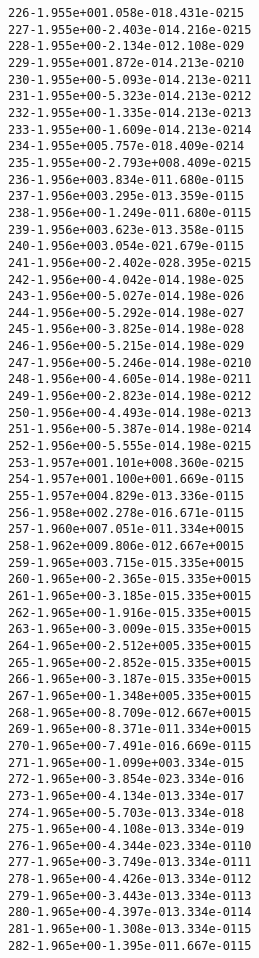 \begin{alltt}
 226  -1.955e+00   1.058e-01   8.431e-02   15
 227  -1.955e+00  -2.403e-01   4.216e-02   15
 228  -1.955e+00  -2.134e-01   2.108e-02    9
 229  -1.955e+00   1.872e-01   4.213e-02   10
 230  -1.955e+00  -5.093e-01   4.213e-02   11
 231  -1.955e+00  -5.323e-01   4.213e-02   12
 232  -1.955e+00  -1.335e-01   4.213e-02   13
 233  -1.955e+00  -1.609e-01   4.213e-02   14
 234  -1.955e+00   5.757e-01   8.409e-02   14
 235  -1.955e+00  -2.793e+00   8.409e-02   15
 236  -1.956e+00   3.834e-01   1.680e-01   15
 237  -1.956e+00   3.295e-01   3.359e-01   15
 238  -1.956e+00  -1.249e-01   1.680e-01   15
 239  -1.956e+00   3.623e-01   3.358e-01   15
 240  -1.956e+00   3.054e-02   1.679e-01   15
 241  -1.956e+00  -2.402e-02   8.395e-02   15
 242  -1.956e+00  -4.042e-01   4.198e-02    5
 243  -1.956e+00  -5.027e-01   4.198e-02    6
 244  -1.956e+00  -5.292e-01   4.198e-02    7
 245  -1.956e+00  -3.825e-01   4.198e-02    8
 246  -1.956e+00  -5.215e-01   4.198e-02    9
 247  -1.956e+00  -5.246e-01   4.198e-02   10
 248  -1.956e+00  -4.605e-01   4.198e-02   11
 249  -1.956e+00  -2.823e-01   4.198e-02   12
 250  -1.956e+00  -4.493e-01   4.198e-02   13
 251  -1.956e+00  -5.387e-01   4.198e-02   14
 252  -1.956e+00  -5.555e-01   4.198e-02   15
 253  -1.957e+00   1.101e+00   8.360e-02   15
 254  -1.957e+00   1.100e+00   1.669e-01   15
 255  -1.957e+00   4.829e-01   3.336e-01   15
 256  -1.958e+00   2.278e-01   6.671e-01   15
 257  -1.960e+00   7.051e-01   1.334e+00   15
 258  -1.962e+00   9.806e-01   2.667e+00   15
 259  -1.965e+00   3.715e-01   5.335e+00   15
 260  -1.965e+00  -2.365e-01   5.335e+00   15
 261  -1.965e+00  -3.185e-01   5.335e+00   15
 262  -1.965e+00  -1.916e-01   5.335e+00   15
 263  -1.965e+00  -3.009e-01   5.335e+00   15
 264  -1.965e+00  -2.512e+00   5.335e+00   15
 265  -1.965e+00  -2.852e-01   5.335e+00   15
 266  -1.965e+00  -3.187e-01   5.335e+00   15
 267  -1.965e+00  -1.348e+00   5.335e+00   15
 268  -1.965e+00  -8.709e-01   2.667e+00   15
 269  -1.965e+00  -8.371e-01   1.334e+00   15
 270  -1.965e+00  -7.491e-01   6.669e-01   15
 271  -1.965e+00  -1.099e+00   3.334e-01    5
 272  -1.965e+00  -3.854e-02   3.334e-01    6
 273  -1.965e+00  -4.134e-01   3.334e-01    7
 274  -1.965e+00  -5.703e-01   3.334e-01    8
 275  -1.965e+00  -4.108e-01   3.334e-01    9
 276  -1.965e+00  -4.344e-02   3.334e-01   10
 277  -1.965e+00  -3.749e-01   3.334e-01   11
 278  -1.965e+00  -4.426e-01   3.334e-01   12
 279  -1.965e+00  -3.443e-01   3.334e-01   13
 280  -1.965e+00  -4.397e-01   3.334e-01   14
 281  -1.965e+00  -1.308e-01   3.334e-01   15
 282  -1.965e+00  -1.395e-01   1.667e-01   15

\end{alltt}
